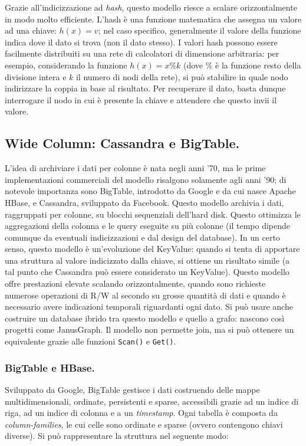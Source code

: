 \documentclass[a4page, 11pt]{article}
\begin{document}
Grazie all'indicizzazione ad \textit{hash}, questo modello riesce a scalare orizzontalmente in modo molto efficiente.
L'hash è una funzione matematica che assegna un valore ad una chiave: $h(x) = v$; nel caso specifico, generalmente il valore della funzione indica dove il dato si trova (non il dato stesso).
I valori hash possono essere facilmente distribuiti su una rete di calcolatori di dimensione arbitraria: per esempio, considerando la funzione $h(x) = x \% k$ (dove $\%$ è la funzione resto della divisione intera e $k$ il numero di nodi della rete), si può stabilire in quale nodo indirizzare la coppia in base al risultato.
Per recuperare il dato, basta dunque interrogare il nodo in cui è presente la chiave e attendere che questo invii il valore.


\subsection{Wide Column: Cassandra\cite{Cassandra} e BigTable.}
L'idea di archiviare i dati per colonne è nata negli anni '70, ma le prime implementazioni commerciali del modello risalgono solamente agli anni '90; di notevole importanza sono BigTable, introdotto da Google e da cui nasce Apache HBase, e Cassandra, sviluppato da Facebook.
Questo modello archivia i dati, raggruppati per colonne, su blocchi sequenziali dell'hard disk.
Questo ottimizza le aggregazioni della colonna e le query eseguite su più colonne (il tempo dipende comunque da eventuali indicizzazioni e dal design del database).
In un certo senso, questo modello è un'evoluzione del KeyValue: quando si tenta di apportare una struttura al valore indicizzato dalla chiave, si ottiene un risultato simile (a tal punto che Cassandra può essere considerato un KeyValue).
Questo modello offre prestazioni elevate scalando orizzontalmente, quando sono richieste numerose operazioni di R/W al secondo su grosse quantità di dati e quando è necessario avere indicazioni temporali riguardanti ogni dato.
Si può usare anche costruire un database ibrido tra questo modello e quello a grafo: nascono così progetti come JanusGraph.
Il modello non permette join, ma si può ottenere un equivalente grazie alle funzioni \verb|Scan()| e \verb|Get()|.

\subsubsection*{BigTable e HBase.}
Sviluppato da Google, BigTable gestisce i dati costruendo delle mappe multidimensionali, ordinate, persistenti e sparse, accessibili grazie ad un indice di riga, ad un indice di colonna e a un \textit{timestamp}.
Ogni tabella è composta da \textit{column-families}, le cui celle sono ordinate e sparse (ovvero contengono chiavi diverse).
Si può rappresentare la struttura nel seguente modo:
\end{document}
